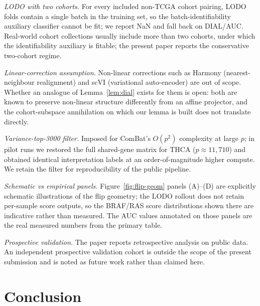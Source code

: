 \documentclass[11pt,a4paper]{article}
\begin{document}
\emph{LODO with two cohorts.} For every included non-TCGA cohort
pairing, LODO folds contain a single batch in the training set, so
the batch-identifiability auxiliary classifier cannot be fit; we
report NaN and fall back on DIAL/AUC. Real-world cohort collections
usually include more than two cohorts, under which the identifiability
auxiliary is fitable; the present paper reports the conservative
two-cohort regime.

\emph{Linear-correction assumption.} Non-linear corrections such as
Harmony \citep{korsunsky2019harmony} (nearest-neighbour realignment)
and scVI \citep{lopez2018scvi} (variational auto-encoder) are out of
scope. Whether an analogue of Lemma~\ref{lem:dial} exists for them is
open: both are known to preserve non-linear structure differently
from an affine projector, and the cohort-subspace annihilation on
which our lemma is built does not translate directly.

\emph{Variance-top-3000 filter.} Imposed for ComBat's $O(p^2)$
complexity at large $p$; in pilot runs we restored the full
shared-gene matrix for THCA ($p \approx 11{,}710$) and obtained
identical interpretation labels at an order-of-magnitude higher
compute. We retain the filter for reproducibility of the public
pipeline.

\emph{Schematic vs empirical panels.} Figure~\ref{fig:flip-geom}
panels (A)--(D) are explicitly schematic illustrations of the flip
geometry; the LODO rollout does not retain per-sample score outputs,
so the BRAF/RAS score distributions shown there are indicative rather
than measured. The AUC values annotated on those panels are the real
measured numbers from the primary table.

\emph{Prospective validation.} The paper reports retrospective
analysis on public data. An independent prospective validation
cohort is outside the scope of the present submission and is noted
as future work rather than claimed here.

\section{Conclusion}
\label{sec:conclusion}
\end{document}
